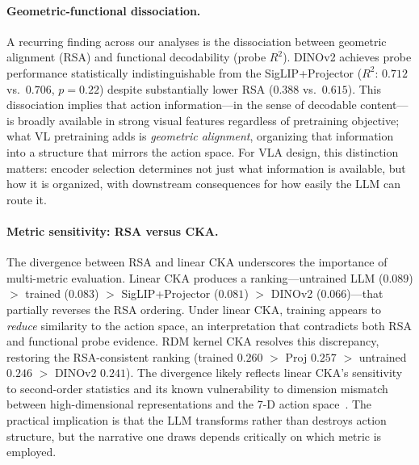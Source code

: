 \paragraph{Geometric-functional dissociation.}
A recurring finding across our analyses is the dissociation between geometric alignment (RSA) and functional decodability (probe $R^2$).
DINOv2 achieves probe performance statistically indistinguishable from the SigLIP+Projector ($R^2$: $0.712$ vs.\ $0.706$, $p = 0.22$) despite substantially lower RSA ($0.388$ vs.\ $0.615$).
This dissociation implies that action information---in the sense of decodable content---is broadly available in strong visual features regardless of pretraining objective; what VL pretraining adds is \emph{geometric alignment}, organizing that information into a structure that mirrors the action space.
For VLA design, this distinction matters: encoder selection determines not just what information is available, but how it is organized, with downstream consequences for how easily the LLM can route it.

\paragraph{Metric sensitivity: RSA versus CKA.}
The divergence between RSA and linear CKA underscores the importance of multi-metric evaluation.
Linear CKA produces a ranking---untrained LLM ($0.089$) $>$ trained ($0.083$) $>$ SigLIP+Projector ($0.081$) $>$ DINOv2 ($0.066$)---that partially reverses the RSA ordering.
Under linear CKA, training appears to \emph{reduce} similarity to the action space, an interpretation that contradicts both RSA and functional probe evidence.
RDM kernel CKA resolves this discrepancy, restoring the RSA-consistent ranking (trained $0.260$ $>$ Proj $0.257$ $>$ untrained $0.246$ $>$ DINOv2 $0.241$).
The divergence likely reflects linear CKA's sensitivity to second-order statistics and its known vulnerability to dimension mismatch between high-dimensional representations and the 7-D action space~\cite{kornblith2019}.
The practical implication is that the LLM transforms rather than destroys action structure, but the narrative one draws depends critically on which metric is employed.


